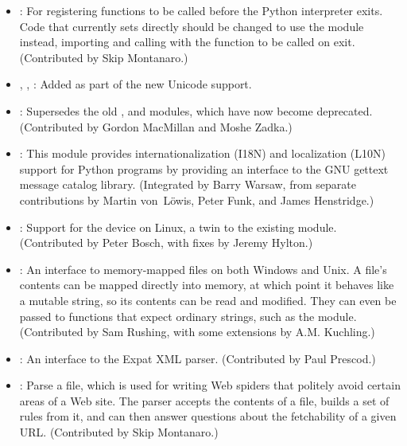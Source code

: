 \documentclass{howto}
\begin{document}
\begin{itemize}

\item{}: 
For registering functions to be called before the Python interpreter exits.
Code that currently sets
 directly should be changed to 
use the  module instead, importing 
and calling  with 
the function to be called on exit.
(Contributed by Skip Montanaro.)

\item{, , :}  Added as part of the new Unicode support. 

\item{:} Supersedes the old ,  and
 modules, which have now become deprecated.
(Contributed by Gordon MacMillan and Moshe Zadka.)

\item{:} This module provides internationalization
(I18N) and localization (L10N) support for Python programs by
providing an interface to the GNU gettext message catalog library.
(Integrated by Barry Warsaw, from separate contributions by Martin 
von~L\"owis, Peter Funk, and James Henstridge.)

\item{:} Support for the 
device on Linux, a twin to the existing  module.
(Contributed by Peter Bosch, with fixes by Jeremy Hylton.)

\item{:} An interface to memory-mapped files on both
Windows and Unix.  A file's contents can be mapped directly into
memory, at which point it behaves like a mutable string, so its
contents can be read and modified.  They can even be passed to
functions that expect ordinary strings, such as the 
module. (Contributed by Sam Rushing, with some extensions by
A.M. Kuchling.)

\item{:} An interface to the Expat XML parser.
(Contributed by Paul Prescod.)

\item{:} Parse a  file, which is
used for writing Web spiders that politely avoid certain areas of a
Web site.  The parser accepts the contents of a  file,
builds a set of rules from it, and can then answer questions about
the fetchability of a given URL.  (Contributed by Skip Montanaro.)


\end{itemize}
\end{document}
